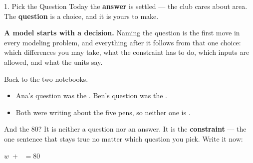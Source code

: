 \documentclass[10pt]{article}
\begin{document}
\begin{notesbox}{1. Pick the Question}
\medskip
Today the \textbf{answer} is settled --- the club cares about area. The
\textbf{question} is a choice, and it is yours to make.

\smallskip
\begin{center}
\begin{tcolorbox}[colback=lilac, colframe=plum, boxrule=0.8pt, arc=2mm,
    left=3mm, right=3mm, top=2mm, bottom=2mm, width=0.94\linewidth]
\textbf{A model starts with a decision.} Naming the question is the first move
in every modeling problem, and everything after it follows from that one
choice: which differences you may take, what the constraint has to do, which
inputs are allowed, and what the units say.
\end{tcolorbox}
\end{center}

\medskip
Back to the two notebooks.

\smallskip
\begin{itemize}[itemsep=4pt]
  \item Ana's question was the \blank{2.4cm}. \quad Ben's question was the
        \blank{2.4cm}.
  \item Both were writing about the \blank{2cm} five pens, so neither one is
        \blank{2cm}.
\end{itemize}

\medskip
And the 80? It is neither a question nor an answer. It is the
\textbf{constraint} --- the one sentence that stays true no matter which
question you pick. Write it now:

\begin{center}
\blank{1cm} $w \; + \;$ \blank{1cm} $= 80$
\end{center}
\end{notesbox}

\vspace{0.1in}
\end{document}
